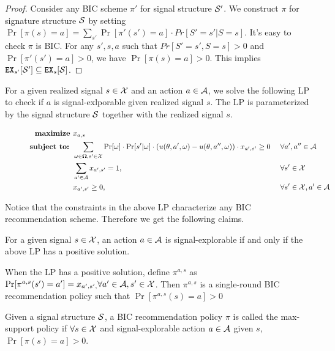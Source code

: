 \begin{proof}
Consider any BIC scheme $\pi'$ for signal structure $\S'$. We construct $\pi$ for signature structure $\S$ by setting $\Pr[\pi(s) = a] = \sum_{s'} \Pr[\pi'(s') = a] \cdot Pr[S' = s'|S = s]$. It's easy to check $\pi$ is BIC. For any $s', s ,a$ such that $Pr[S' = s',S = s] >0 $ and $\Pr[\pi'(s') = a] >0$, we have $\Pr[\pi(s) = a] > 0$. This implies $\EX_{s'}[\S'] \subseteq \EX_s[\S]$.
\end{proof}

For a given realized signal $s \in \X$ and an action $a \in \A$, we solve the following LP to check if $a$ is signal-exlporable given realized signal $s$. The LP is parameterized by the signal structure $\S$ together with the realized signal $s$. 

\begin{figure}[H]
\begin{mdframed}
\begin{alignat*}{2}
  \textbf{maximize }   & x_{a,s}\  \\
  \textbf{subject to: } & \sum_{\omega \in \varOmega, s' \in \X} \Pr[\omega] \cdot \Pr[s' | \omega] \cdot \left(u(\theta, a', \omega) - u(\theta, a'', \omega)\right) \cdot x_{a',s'} \geq 0   &\ & \forall a',a'' \in \A \\
                       & \sum_{a'\in \A} x_{a',s'} = 1,  \ &\ & \forall s' \in \X \\
                       & x_{a',s'} \geq 0,  \ &\ & \forall s' \in \X, a'\in \A \\
\end{alignat*}
\end{mdframed}
\label{fig:public_lp}
\end{figure}

Notice that the constraints in the above LP characterize any BIC recommendation scheme. Therefore we get the following claims.
\begin{claim}
For a given signal $s \in \X$, an action $a \in \A$ is signal-explorable if and only if the above LP has a positive solution. 
\end{claim}

\begin{claim}
When the LP has a positive solution, define $\pi^{a,s}$ as $\Pr[\pi^{a,s}(s') = a'] = x_{a',s', } \forall a' \in \A, s' \in \X$. Then $\pi^{a,s}$ is a single-round BIC recommendation policy such that $\Pr[\pi^{a,s}(s) = a] > 0$
\end{claim}

\begin{definition}
Given a signal structure $\S$, a BIC recommendation policy $\pi$ is called the max-support policy if $\forall s \in \X$  and signal-explorable action $a\in \A$ given $s$, $\Pr[\pi(s) = a] > 0$.
\end{definition}


